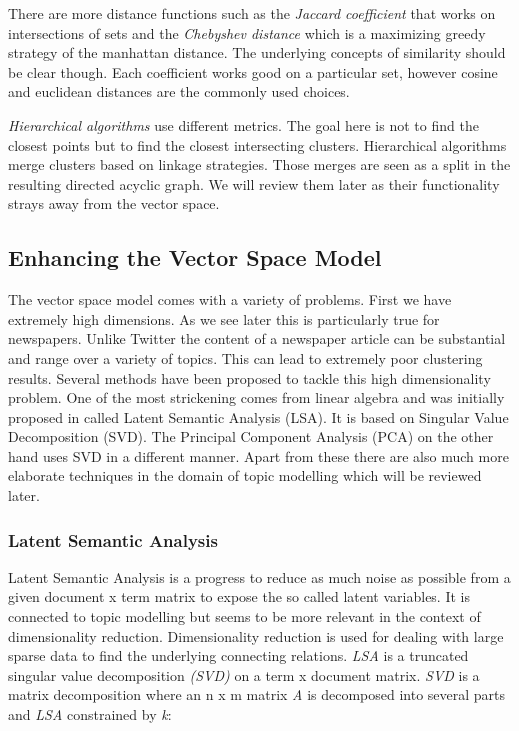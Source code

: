     There are more distance functions such as the \emph{Jaccard coefficient} that works on intersections of sets and the \emph{Chebyshev distance} which is a maximizing greedy strategy of the manhattan distance. The underlying concepts of similarity should be clear though. Each coefficient works good on a particular set, however cosine and euclidean distances are the commonly used choices.

    \emph{Hierarchical algorithms} use different metrics. The goal here is not to find the closest points but to find the closest intersecting clusters. Hierarchical algorithms merge clusters based on linkage strategies. Those merges are seen as a split in the resulting directed acyclic graph. We will review them later as their functionality strays away from the vector space.

  \subsection{Enhancing the Vector Space Model}

    The vector space model comes with a variety of problems. First we have extremely high dimensions. As we see later this is particularly true for newspapers. Unlike Twitter the content of a newspaper article can be substantial and range over a variety of topics. This can lead to extremely poor clustering results. Several methods have been proposed to tackle this high dimensionality problem. One of the most strickening comes from linear algebra and was initially proposed in \cite{DeerwesterLSI1990} called Latent Semantic Analysis (LSA). It is based on Singular Value Decomposition (SVD). The Principal Component Analysis (PCA) on the other hand uses SVD in a different manner. Apart from these there are also much more elaborate techniques in the domain of topic modelling which will be reviewed later.

    \subsubsection{Latent Semantic Analysis}
      Latent Semantic Analysis is a progress to reduce as much noise as possible from a given document x term matrix to expose the so called latent variables. It is connected to topic modelling but seems to be more relevant in the context of dimensionality reduction. Dimensionality reduction is used for dealing with large sparse data to find the underlying connecting relations. \emph{LSA} is a truncated singular value decomposition \emph{(SVD)} on a term x document matrix. \emph{SVD} is a matrix decomposition where an n x m matrix \emph{A} is decomposed into several parts and \emph{LSA} constrained by \emph{k}:

